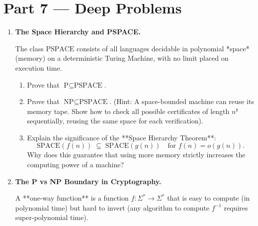 \documentclass[12pt, a4paper]{book}
\begin{document}
\newpage

\section{Part 7 --- Deep Problems}

\begin{deepbox}
\begin{enumerate}[label=\textbf{D\arabic*.}]
  \item \textbf{The Space Hierarchy and PSPACE.}
  
        The class $\text{PSPACE}$ consists of all languages decidable in polynomial *space* (memory) on a deterministic Turing Machine, with no limit placed on execution time.
        
        \begin{enumerate}[label=(\alph*)]
          \item Prove that $\text{P} \subseteq \text{PSPACE}$.
          \item Prove that $\text{NP} \subseteq \text{PSPACE}$. (Hint: A space-bounded machine can reuse its memory tape. Show how to check all possible certificates of length $n^k$ sequentially, reusing the same space for each verification).
          \item Explain the significance of the **Space Hierarchy Theorem**:
                \[
                  \text{SPACE}(f(n)) \;\subsetneq\; \text{SPACE}(g(n)) \quad \text{for } f(n) = o(g(n)).
                \]
                Why does this guarantee that using more memory strictly increases the computing power of a machine?
        \end{enumerate}

  \item \textbf{The P vs NP Boundary in Cryptography.}
  
        A **one-way function** is a function $f: \Sigma^* \to \Sigma^*$ that is easy to compute (in polynomial time) but hard to invert (any algorithm to compute $f^{-1}$ requires super-polynomial time).
        

\end{enumerate}
\end{deepbox}
\end{document}
